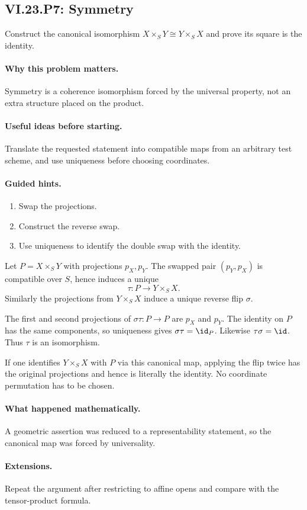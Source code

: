 \subsection*{VI.23.P7: Symmetry}
\begin{problem}\label{prob:vi23-p07}
Construct the canonical isomorphism $X\times_SY\cong Y\times_SX$ and prove its square is the identity.
\end{problem}

\ifdefined\FullProblemDossiers
\paragraph{Why this problem matters.}
Symmetry is a coherence isomorphism forced by the universal property, not an extra structure placed on the product.

\paragraph{Useful ideas before starting.}
Translate the requested statement into compatible maps from an arbitrary test scheme, and use uniqueness before choosing coordinates.

\paragraph{Guided hints.}
\begin{enumerate}
\item Swap the projections.
\item Construct the reverse swap.
\item Use uniqueness to identify the double swap with the identity.
\end{enumerate}

\begin{solution}
Let $P=X\times_SY$ with projections $p_X,p_Y$.  The swapped pair $(p_Y,p_X)$ is compatible
over $S$, hence induces a unique
\[
\tau:P\to Y\times_SX.
\]
Similarly the projections from $Y\times_SX$ induce a unique reverse flip $\sigma$.

The first and second projections of $\sigma\tau:P\to P$ are $p_X$ and $p_Y$.  The identity on
$P$ has the same components, so uniqueness gives $\sigma\tau=\id_P$.  Likewise
$\tau\sigma=\id$.  Thus $\tau$ is an isomorphism.

If one identifies $Y\times_SX$ with $P$ via this canonical map, applying the flip twice has the
original projections and hence is literally the identity.  No coordinate permutation has to be
chosen.
\end{solution}

\paragraph{What happened mathematically.}
A geometric assertion was reduced to a representability statement, so the canonical map was forced by universality.

\paragraph{Extensions.}
Repeat the argument after restricting to affine opens and compare with the tensor-product formula.
\fi
